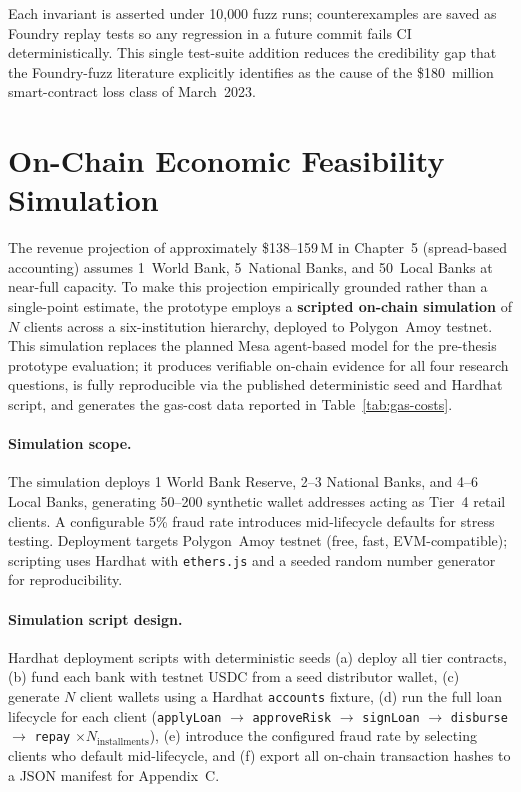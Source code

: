 \documentclass[12pt,a4paper]{report}
\begin{document}
Each invariant is asserted under 10{,}000 fuzz runs; counterexamples are saved as Foundry replay tests so any regression in a future commit fails CI deterministically. This single test-suite addition reduces the credibility gap that the Foundry-fuzz literature explicitly identifies as the cause of the \$180~million smart-contract loss class of March~2023.

\section{On-Chain Economic Feasibility Simulation}
\label{sec:abm-sim}

The revenue projection of approximately \$138--159\,M in Chapter~5 (spread-based accounting) assumes 1~World Bank, 5~National Banks, and 50~Local Banks at near-full capacity. To make this projection empirically grounded rather than a single-point estimate, the prototype employs a \textbf{scripted on-chain simulation} of $N$ clients across a six-institution hierarchy, deployed to Polygon~Amoy testnet. This simulation replaces the planned Mesa agent-based model for the pre-thesis prototype evaluation; it produces verifiable on-chain evidence for all four research questions, is fully reproducible via the published deterministic seed and Hardhat script, and generates the gas-cost data reported in Table~\ref{tab:gas-costs}.

\paragraph{Simulation scope.}
The simulation deploys 1 World Bank Reserve, 2--3 National Banks, and 4--6 Local Banks, generating 50--200 synthetic wallet addresses acting as Tier~4 retail clients. A configurable 5\% fraud rate introduces mid-lifecycle defaults for stress testing. Deployment targets Polygon~Amoy testnet (free, fast, EVM-compatible); scripting uses Hardhat with \texttt{ethers.js} and a seeded random number generator for reproducibility.

\paragraph{Simulation script design.}
Hardhat deployment scripts with deterministic seeds (a) deploy all tier contracts, (b) fund each bank with testnet USDC from a seed distributor wallet, (c) generate $N$ client wallets using a Hardhat \texttt{accounts} fixture, (d) run the full loan lifecycle for each client (\texttt{applyLoan} $\to$ \texttt{approveRisk} $\to$ \texttt{signLoan} $\to$ \texttt{disburse} $\to$ \texttt{repay} $\times N_\text{installments}$), (e) introduce the configured fraud rate by selecting clients who default mid-lifecycle, and (f) export all on-chain transaction hashes to a JSON manifest for Appendix~C.
\end{document}
